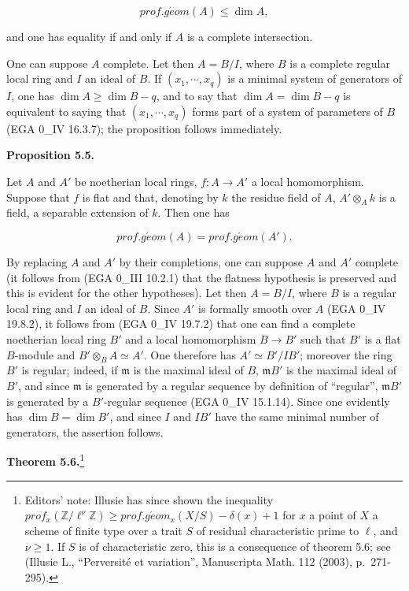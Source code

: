\documentclass[
]{article}
\begin{document}
\[
prof.g\acute{e}om(A) \leqslant \dim A,
\]

and one has equality if and only if \(A\) is a complete intersection.

One can suppose \(A\) complete. Let then \(A = B/I\), where \(B\) is a
complete regular local ring and \(I\) an ideal of \(B\). If
\((x_{1}, \cdots, x_{q})\) is a minimal system of generators of \(I\),
one has \(\dim A \geqslant \dim B - q\), and to say that
\(\dim A = \dim B - q\) is equivalent to saying that
\((x_{1}, \cdots, x_{q})\) forms part of a system of parameters of \(B\)
(EGA 0\_IV 16.3.7); the proposition follows immediately.

\textbf{Proposition 5.5.}

Let \(A\) and \(A'\) be noetherian local rings, \(f : A \to A'\) a local
homomorphism. Suppose that \(f\) is flat and that, denoting by \(k\) the
residue field of \(A\), \(A' \otimes_{A} k\) is a field, a separable
extension of \(k\). Then one has

\[
prof.g\acute{e}om(A) = prof.g\acute{e}om(A').
\]

By replacing \(A\) and \(A'\) by their completions, one can suppose
\(A\) and \(A'\) complete (it follows from (EGA 0\_III 10.2.1) that the
flatness hypothesis is preserved and this is evident for the other
hypotheses). Let then \(A = B/I\), where \(B\) is a regular local ring
and \(I\) an ideal of \(B\). Since \(A'\) is formally smooth over \(A\)
(EGA 0\_IV 19.8.2), it follows from (EGA 0\_IV 19.7.2) that one can find
a complete noetherian local ring \(B'\) and a local homomorphism
\(B \to B'\) such that \(B'\) is a flat \(B\)-module and
\(B' \otimes_{B} A \simeq A'\). One therefore has \(A' \simeq B'/IB'\);
moreover the ring \(B'\) is regular; indeed, if \(\mathfrak{m}\) is the
maximal ideal of \(B\), \(\mathfrak{m} B'\) is the maximal ideal of
\(B'\), and since \(\mathfrak{m}\) is generated by a regular sequence by
definition of ``regular'', \(\mathfrak{m} B'\) is generated by a
\(B'\)-regular sequence (EGA 0\_IV 15.1.14). Since one evidently has
\(\dim B = \dim B'\), and since \(I\) and \(IB'\) have the same minimal
number of generators, the assertion follows.

\textbf{Theorem 5.6.}\footnote{Editors' note: Illusie has since shown
  the inequality
  \(prof_{x}(\mathbb{Z}/\ell^{\nu} \mathbb{Z}) \geqslant prof.g\acute{e}om_{x}(X/S) - \delta(x) + 1\)
  for \(x\) a point of \(X\) a scheme of finite type over a trait \(S\)
  of residual characteristic prime to \(\ell\), and \(\nu \geqslant 1\).
  If \(S\) is of characteristic zero, this is a consequence of theorem
  5.6; see (Illusie L., ``Perversité et variation'', Manuscripta Math.
  112 (2003), p.~271-295).}
\end{document}
